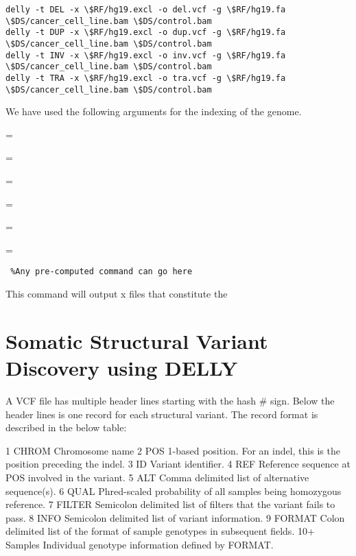 \begin{steps}

\begin{lstlisting}
delly -t DEL -x \$RF/hg19.excl -o del.vcf -g \$RF/hg19.fa \$DS/cancer_cell_line.bam \$DS/control.bam
delly -t DUP -x \$RF/hg19.excl -o dup.vcf -g \$RF/hg19.fa \$DS/cancer_cell_line.bam \$DS/control.bam
delly -t INV -x \$RF/hg19.excl -o inv.vcf -g \$RF/hg19.fa \$DS/cancer_cell_line.bam \$DS/control.bam
delly -t TRA -x \$RF/hg19.excl -o tra.vcf -g \$RF/hg19.fa \$DS/cancer_cell_line.bam \$DS/control.bam

\end{lstlisting}

We have used the following arguments for the indexing of the genome.
\begin{description}[style=multiline,labelindent=0cm,align=right,leftmargin=\descriptionlabelspace,rightmargin=1.5cm,font=\ttfamily]
  \item[DEL] = 
  \item[DUP] = 
  \item[INV] = 
  \item[TRA] = 
  \item[-o] = 
  \item[-g] = 
\end{description}

\begin{warning}
  \begin{lstlisting}
 %Any pre-computed command can go here
  \end{lstlisting}
\end{warning}

This command will output x files that constitute the 

\section{Somatic Structural Variant Discovery using DELLY}

\begin{information}
A VCF file has multiple header lines starting with the hash # sign. Below the header lines is one record for each structural variant. The record format is described in the below table:

1	CHROM	Chromosome name
2 	POS 		1-based position. For an indel, this is the position preceding the indel.
3 	ID 		Variant identifier. 
4	REF		Reference sequence at POS involved in the variant. 
5	ALT		Comma delimited list of alternative sequence(s).
6	QUAL		Phred-scaled probability of all samples being homozygous reference.
7	FILTER	Semicolon delimited list of filters that the variant fails to pass.
8	INFO		Semicolon delimited list of variant information.
9	FORMAT	Colon delimited list of the format of sample genotypes in subsequent fields.
10+ 	Samples	Individual genotype information defined by FORMAT.


\end{information}
\end{steps}
